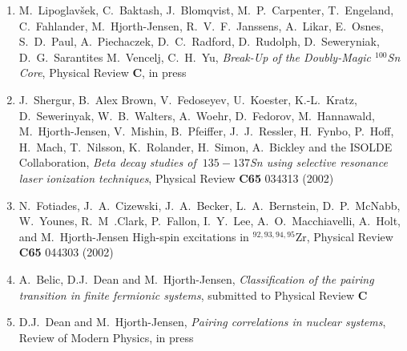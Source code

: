 \begin{enumerate}
\item 
M.~Lipoglav\v{s}ek, C.~Baktash, J.~Blomqvist,
M.~P.~Carpenter, T.~Engeland, C.~Fahlander,
M.~Hjorth-Jensen, R.~V.~F.~Janssens, A.~Likar,
E.~Osnes, S.~D.~Paul, A.~Piechaczek, D.~C.~Radford,
D.~Rudolph, D.~Seweryniak, D.~G.~Sarantites M.~Vencelj, C.~H.~Yu,
{\em Break-Up of the Doubly-Magic $^{100}$Sn Core}, 
Physical Review {\bf C}, in press


\item J.\ Shergur, B.~Alex Brown, V.\ Fedoseyev, U.\ Koester, K.-L.\ Kratz, 
D.\ Sewerinyak, W.\ B.\ Walters, A.\ Woehr, D.\ Fedorov, M.\ Hannawald, M.~Hjorth-Jensen,  V.\ Mishin, B.\ Pfeiffer, J.\ J.\ Ressler, H.\ Fynbo, P.\ Hoff, H.\ Mach, T.\ Nilsson, K.\ Rolander, H.\ Simon, A.\ Bickley and the ISOLDE Collaboration, 
{\em Beta decay studies of $~{135-137}$Sn  using selective resonance laser ionization techniques},
Physical Review {\bf C65} 034313 (2002) 

\item N.~Fotiades, J.~A.~Cizewski, J.~A.~Becker, L.~A.~Bernstein, 
      D.~P.~McNabb, W.~Younes, R.~M~.Clark, P.~Fallon, I.~Y.~Lee, 
      A.~O.~Macchiavelli, A.~Holt, and M.~Hjorth-Jensen 
High-spin excitations in $^{92,93,94,95}$Zr, 
Physical Review {\bf C65} 044303 (2002) 


\item A.~Belic, D.J.~Dean and M.~Hjorth-Jensen, {\em Classification
of the pairing transition in finite fermionic systems}, 
submitted to Physical Review {\bf C}

\item D.J.~Dean and M.~Hjorth-Jensen, {\em Pairing correlations in
      nuclear systems}, Review of Modern
      Physics, in press


\end{enumerate}
